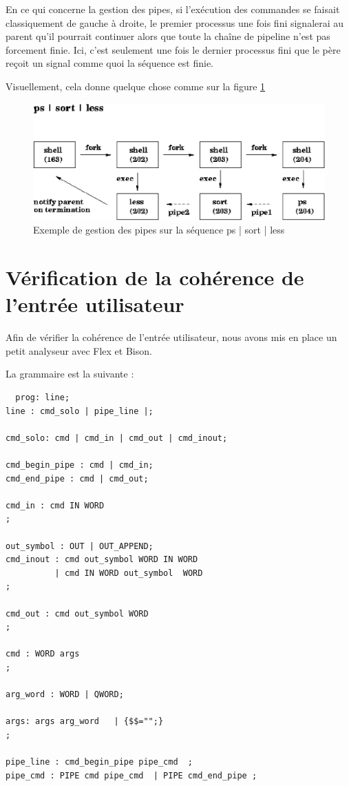 \documentclass[fr]{article}
\begin{document}
En ce qui concerne la gestion des pipes, si l'exécution des commandes se faisait classiquement de gauche à
droite, le premier processus une fois fini signalerai au parent qu'il
pourrait continuer alors que toute la chaîne de pipeline n'est pas
forcement finie. Ici, c'est seulement une fois le dernier processus
fini que le père reçoit un signal comme quoi la séquence est finie.


Visuellement, cela donne quelque chose comme sur la figure \ref{pipe} 
\begin{figure}[!h]
\centering
  \includegraphics[scale=0.5]{img/pipes}
  \caption{Exemple de gestion des pipes sur la séquence ps | sort | less}
\label{pipe}
\end{figure}

\section{Vérification de la cohérence de l'entrée utilisateur}

Afin de vérifier la cohérence de l'entrée utilisateur, nous avons mis
en place un petit analyseur avec Flex et Bison.

La grammaire est la suivante :
\begin{lstlisting}
  prog: line;
line : cmd_solo | pipe_line |;

cmd_solo: cmd | cmd_in | cmd_out | cmd_inout;

cmd_begin_pipe : cmd | cmd_in;
cmd_end_pipe : cmd | cmd_out;

cmd_in : cmd IN WORD 
;

out_symbol : OUT | OUT_APPEND;
cmd_inout : cmd out_symbol WORD IN WORD
          | cmd IN WORD out_symbol  WORD 
;

cmd_out : cmd out_symbol WORD 
;

cmd : WORD args 
;

arg_word : WORD | QWORD;

args: args arg_word   | {$$="";}
;

pipe_line : cmd_begin_pipe pipe_cmd  ;
pipe_cmd : PIPE cmd pipe_cmd  | PIPE cmd_end_pipe ;
\end{lstlisting}
\end{document}
